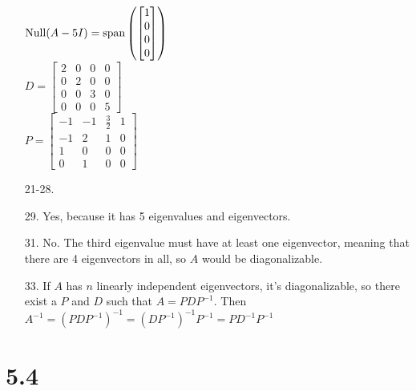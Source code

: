 \documentclass[leqno]{article}
\begin{document}
\begin{enumerate}
    $\displaystyle \operatorname{Null}(A - 5I) = \mathrm{span}\left(\begin{bmatrix}1 \\ 0 \\ 0 \\ 0\end{bmatrix}\right)$\\
    $D = \begin{bmatrix}2 & 0 & 0 & 0\\ 0 & 2 & 0 & 0 \\ 0 & 0 & 3 & 0 \\ 0 & 0 & 0 & 5\end{bmatrix}$\\
    $P = \begin{bmatrix}-1 & -1 & \frac 3 2 & 1 \\ -1 & 2 & 1 & 0 \\ 1 & 0 & 0 & 0 \\ 0 & 1 & 0 & 0 \end{bmatrix}$

    \item[21-28.]
    \item[29.]
    Yes, because it has 5 eigenvalues and eigenvectors.
    \item[31.]
    No. The third eigenvalue must have at least one eigenvector, meaning that there are 4 eigenvectors in all, so $A$ would be diagonalizable.
    \item[33.]
    If $A$ has $n$ linearly independent eigenvectors, it's diagonalizable, so there exist a $P$ and $D$ such that $A = PDP^{-1}$. Then $A^{-1} = (PDP^{-1})^{-1} = (DP^{-1})^{-1}P^{-1} = PD^{-1}P^{-1}$
\end{enumerate}

\section*{5.4}
\end{document}
